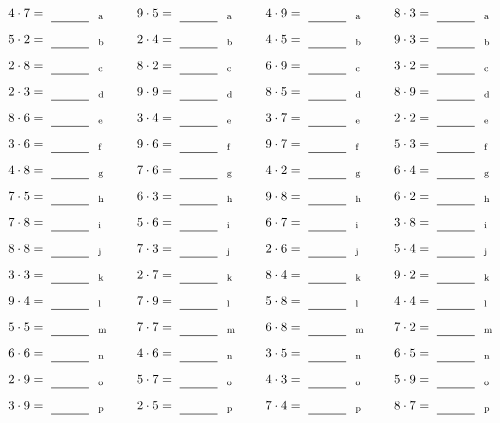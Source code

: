 \documentclass
[
  draft    = true,
  fontsize = 11pt,
  parskip  = half-
]
{scrartcl}
\begin{document}
\par\vfill\par
\begin{align*}
    \pline{4\cdot7}&=\rline{a}
  & \pline{9\cdot5}&=\rline{a}
  & \pline{4\cdot9}&=\rline{a}
  & \pline{8\cdot3}&=\rline{a} \\[1ex]
    \pline{5\cdot2}&=\rline{b}
  & \pline{2\cdot4}&=\rline{b}
  & \pline{4\cdot5}&=\rline{b}
  & \pline{9\cdot3}&=\rline{b} \\[1ex]
    \pline{2\cdot8}&=\rline{c}
  & \pline{8\cdot2}&=\rline{c}
  & \pline{6\cdot9}&=\rline{c}
  & \pline{3\cdot2}&=\rline{c} \\[1ex]
    \pline{2\cdot3}&=\rline{d}
  & \pline{9\cdot9}&=\rline{d}
  & \pline{8\cdot5}&=\rline{d}
  & \pline{8\cdot9}&=\rline{d} \\[1ex]
    \pline{8\cdot6}&=\rline{e}
  & \pline{3\cdot4}&=\rline{e}
  & \pline{3\cdot7}&=\rline{e}
  & \pline{2\cdot2}&=\rline{e} \\[1ex]
    \pline{3\cdot6}&=\rline{f}
  & \pline{9\cdot6}&=\rline{f}
  & \pline{9\cdot7}&=\rline{f}
  & \pline{5\cdot3}&=\rline{f} \\[1ex]
    \pline{4\cdot8}&=\rline{g}
  & \pline{7\cdot6}&=\rline{g}
  & \pline{4\cdot2}&=\rline{g}
  & \pline{6\cdot4}&=\rline{g} \\[1ex]
    \pline{7\cdot5}&=\rline{h}
  & \pline{6\cdot3}&=\rline{h}
  & \pline{9\cdot8}&=\rline{h}
  & \pline{6\cdot2}&=\rline{h} \\[1ex]
    \pline{7\cdot8}&=\rline{i}
  & \pline{5\cdot6}&=\rline{i}
  & \pline{6\cdot7}&=\rline{i}
  & \pline{3\cdot8}&=\rline{i} \\[1ex]
    \pline{8\cdot8}&=\rline{j}
  & \pline{7\cdot3}&=\rline{j}
  & \pline{2\cdot6}&=\rline{j}
  & \pline{5\cdot4}&=\rline{j} \\[1ex]
    \pline{3\cdot3}&=\rline{k}
  & \pline{2\cdot7}&=\rline{k}
  & \pline{8\cdot4}&=\rline{k}
  & \pline{9\cdot2}&=\rline{k} \\[1ex]
    \pline{9\cdot4}&=\rline{l}
  & \pline{7\cdot9}&=\rline{l}
  & \pline{5\cdot8}&=\rline{l}
  & \pline{4\cdot4}&=\rline{l} \\[1ex]
    \pline{5\cdot5}&=\rline{m}
  & \pline{7\cdot7}&=\rline{m}
  & \pline{6\cdot8}&=\rline{m}
  & \pline{7\cdot2}&=\rline{m} \\[1ex]
    \pline{6\cdot6}&=\rline{n}
  & \pline{4\cdot6}&=\rline{n}
  & \pline{3\cdot5}&=\rline{n}
  & \pline{6\cdot5}&=\rline{n} \\[1ex]
    \pline{2\cdot9}&=\rline{o}
  & \pline{5\cdot7}&=\rline{o}
  & \pline{4\cdot3}&=\rline{o}
  & \pline{5\cdot9}&=\rline{o} \\[1ex]
    \pline{3\cdot9}&=\rline{p}
  & \pline{2\cdot5}&=\rline{p}
  & \pline{7\cdot4}&=\rline{p}
  & \pline{8\cdot7}&=\rline{p}
\end{align*}
\end{document}
